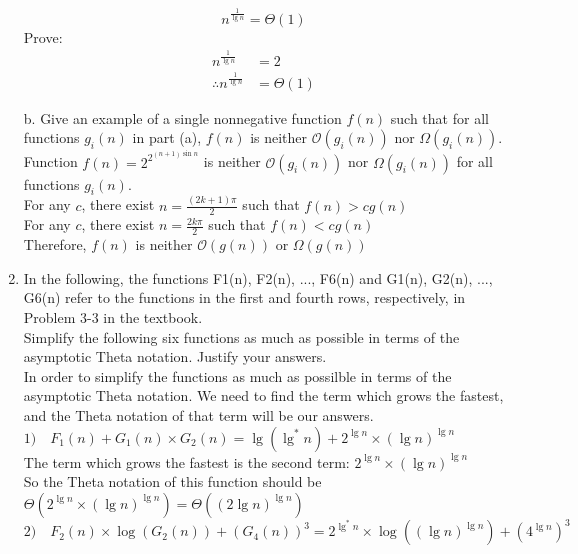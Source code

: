 \documentclass[12pt,letterpaper]{article}
\begin{document}
\begin{enumerate}
$$n^{\frac{1}{\lg n}} = \Theta(1)$$
Prove:
\begin{align*}
n^{\frac{1}{\lg n}} &= 2 \\
\therefore n^{\frac{1}{\lg n}} &= \Theta(1)
\end{align*}

b. Give an example of a single nonnegative function $f(n)$ such that for all functions $g_i(n)$ in part (a), $f(n)$ is neither $\mathcal{O}(g_i(n))$ nor $\Omega(g_i(n))$.\\

Function $f(n) = 2 ^ {2 ^ {(n+1) \sin n}}$ is neither $\mathcal{O}(g_i(n))$ nor $\Omega(g_i(n))$ for all functions $g_i(n)$. \\ 

For any $c$, there exist $n = \frac{(2k+1)\pi}{2}$ such that $f(n) > c g(n)$ \\

For any $c$, there exist $n = \frac{2k \pi}{2}$ such that $f(n) < c g(n)$ \\

Therefore, $ f(n) $ is neither $\mathcal{O}(g(n))$ or $\Omega(g(n))$

\item %
In the following, the functions F1(n), F2(n), ..., F6(n) and G1(n), G2(n), ..., G6(n) refer to the functions in the first and fourth rows, respectively, in Problem 3-3 in the textbook.\\

Simplify the following six functions as much as possible in terms of the asymptotic Theta notation. Justify your answers. \\

In order to simplify the functions as much as possilble in terms of the asymptotic Theta notation. We need to find the term which grows the fastest, and the Theta notation of that term will be our answers. \\

$1) \quad F_1(n) + G_1(n) \times G_2(n) = \lg (\lg ^* n) + 2^{\lg n} \times (\lg n)^{\lg n} $ \\

The term which grows the fastest is the second term: $ 2^{\lg n} \times (\lg n) ^ {\lg n}$ \\

So the Theta notation of this function should be $\Theta( 2^{\lg n} \times (\lg n) ^ {\lg n} ) = \Theta((2 \lg n)^{\lg n})$ \\

$ 2) \quad F_2(n) \times \log(G_2(n)) + (G_4(n))^3 = 2^{\lg ^* n} \times \log((\lg n)^{\lg n}) + (4^{\lg n})^3 $ \\


\end{enumerate}
\end{document}
